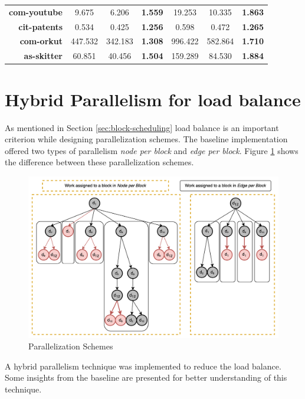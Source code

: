 \begin{table}[]
{\begin{tabular}{r|cc|c|cc|c}
            \textbf{com-youtube}                 & 9.675                                   & 6.206                                 & \textbf{1.559}                          & 19.253                            & 10.335                 & \textbf{1.863} \\
            \textbf{cit-patents}                 & 0.534                                   & 0.425                                 & \textbf{1.256}                          & 0.598                             & 0.472                  & \textbf{1.265} \\
            \textbf{com-orkut}                   & 447.532                                 & 342.183                               & \textbf{1.308}                          & 996.422                           & 582.864                & \textbf{1.710} \\
            \textbf{as-skitter}                  & 60.851                                  & 40.456                                & \textbf{1.504}                          & 159.289                           & 84.530                 & \textbf{1.884}
        \end{tabular}%
    }
    \label{tab:speedups-hy-sym}
\end{table}


\section{Hybrid Parallelism for load balance}

As mentioned in Section \ref{sec:block-scheduling} load balance is an important criterion while designing parallelization schemes.
The baseline implementation \cite{PARSEC_VD} offered two types of parallelism \textit{node per block} and \textit{edge per block}.
Figure \ref{fig:parallelization-schemes} shows the difference between these parallelization schemes.
\begin{figure}
    \includegraphics[width=\textwidth]{fig/parallelization-scheme.png}
    \caption{Parallelization Schemes}
    \label{fig:parallelization-schemes}
\end{figure}
A hybrid parallelism technique was implemented to reduce the load balance.
Some insights from the baseline are presented for better understanding of this technique.
